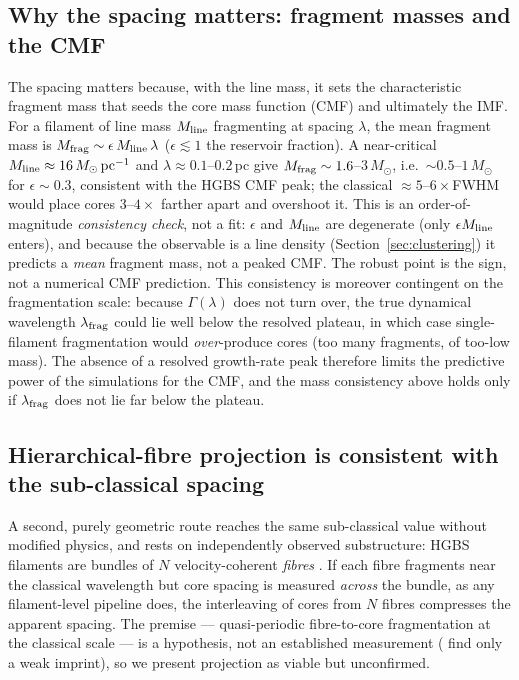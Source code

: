 \documentclass[usenatbib,twoside,twocolumn]{mnras}
\begin{document}
\subsection{Why the spacing matters: fragment masses and the CMF}
\label{sec:cmf}
The spacing matters because, with the line mass, it sets the characteristic fragment mass that seeds the core mass function (CMF) and ultimately the IMF. For a filament of line mass $M_{\rm line}$ fragmenting at spacing $\lambda$, the mean fragment mass is $M_{\rm frag}\sim\epsilon\,M_{\rm line}\,\lambda$ ($\epsilon\lesssim1$ the reservoir fraction). A near-critical $M_{\rm line}\approx16\,M_\odot\,{\rm pc^{-1}}$ and $\lambda\approx0.1$--$0.2$\,pc give $M_{\rm frag}\sim1.6$--$3\,M_\odot$, i.e.\ $\sim0.5$--$1\,M_\odot$ for $\epsilon\sim0.3$, consistent with the HGBS CMF peak; the classical $\approx5$--$6\times$FWHM would place cores $3$--$4\times$ farther apart and overshoot it. This is an order-of-magnitude \emph{consistency check}, not a fit: $\epsilon$ and $M_{\rm line}$ are degenerate (only $\epsilon M_{\rm line}$ enters), and because the observable is a line density (Section~\ref{sec:clustering}) it predicts a \emph{mean} fragment mass, not a peaked CMF. The robust point is the sign, not a numerical CMF prediction. This consistency is moreover contingent on the fragmentation scale: because $\Gamma(\lambda)$ does not turn over, the true dynamical wavelength $\lambda_{\rm frag}$ could lie well below the resolved plateau, in which case single-filament fragmentation would \emph{over}-produce cores (too many fragments, of too-low mass). The absence of a resolved growth-rate peak therefore limits the predictive power of the simulations for the CMF, and the mass consistency above holds only if $\lambda_{\rm frag}$ does not lie far below the plateau.


\subsection{Hierarchical-fibre projection is consistent with the sub-classical spacing}
\label{sec:fibre_projection}

A second, purely geometric route reaches the same sub-classical value without modified physics, and rests on independently observed substructure: HGBS filaments are bundles of $N$ velocity-coherent \emph{fibres} \citep{Hacar2013,Hacar2018,Yang2024}. If each fibre fragments near the classical wavelength but core spacing is measured \emph{across} the bundle, as any filament-level pipeline does, the interleaving of cores from $N$ fibres compresses the apparent spacing. The premise --- quasi-periodic fibre-to-core fragmentation at the classical scale --- is a hypothesis, not an established measurement (\citealt{Yang2024} find only a weak imprint), so we present projection as viable but unconfirmed.
\end{document}
